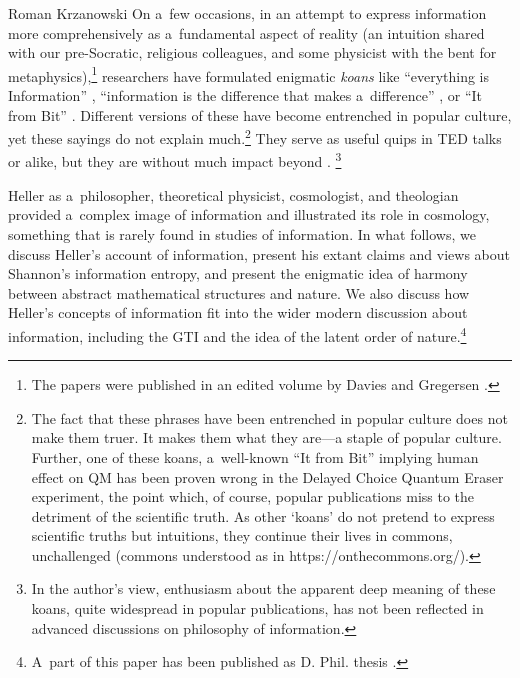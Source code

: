 \begin{artengenv}{Roman Krzanowski}
On a~few occasions, in an attempt to express information more comprehensively as a~fundamental aspect of reality (an intuition shared with our pre-Socratic, religious colleagues, and some physicist with the bent for metaphysics),\footnote{The papers were published in an edited volume by Davies and Gregersen 
\parencite*[][]{Davies2010-DAVIAT-5}.%
} researchers have formulated enigmatic \textit{koans} like ``everything is Information'' 
\parencite[][]{jones_everything_2018}, %
 ``information is the difference that makes a~difference'' 
\parencite[see][]{sloman_what_2018}, %
 or ``It from Bit'' 
\parencite[][]{wheeler_information_1989}. %
 Different versions of these have become entrenched in popular culture, yet these sayings do not explain much.\footnote{The fact that these phrases have been entrenched in popular culture does not make them truer. It makes them what they are---a staple of popular culture. Further, one of these koans, a~well-known ``It from Bit'' 
\parencite[][]{wheeler_information_1989} %
 implying human effect on QM has been proven wrong in the Delayed Choice Quantum Eraser experiment, the point which, of course, popular publications miss to the detriment of the scientific truth. As other ‘koans' do not pretend to express scientific truths but intuitions, they continue their lives in commons, unchallenged (commons understood as in https://onthecommons.org/).} They serve as useful quips in TED talks or alike, but they are without much impact beyond 
\parencite[see e.g][]{tetlow_phil_2017}.%
\footnote{In the author's view, enthusiasm about the apparent deep meaning of these koans, quite widespread in popular publications, has not been reflected in advanced discussions on philosophy of information.}



Heller as a~philosopher, theoretical physicist, cosmologist, and theologian provided a~complex image of information and illustrated its role in cosmology, something that is rarely found in studies of information. In what follows, we discuss Heller's account of information, present his extant claims and views about Shannon's information entropy, and present the enigmatic idea of harmony between abstract mathematical structures and nature. We also discuss how Heller's concepts of information fit into the wider modern discussion about information, including the GTI and the idea of the latent order of nature.\footnote{A~part of this paper has been published as D. Phil. thesis 
\parencite[][]{krzanowski_ontological_2022}.%
}




\end{artengenv}
